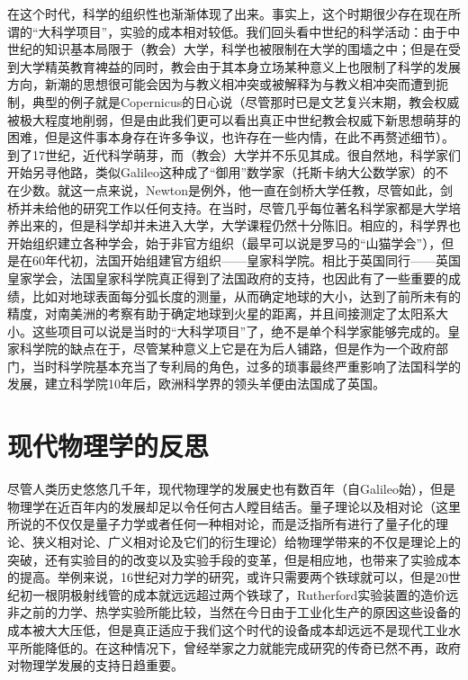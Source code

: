 \documentclass{article}
\begin{document}
在这个时代，科学的组织性也渐渐体现了出来\cite{1}。事实上，这个时期很少存在现在所谓的“大科学项目”，实验的成本相对较低。我们回头看中世纪的科学活动：由于中世纪的知识基本局限于（教会）大学，科学也被限制在大学的围墙之中；但是在受到大学精英教育裨益的同时，教会由于其本身立场某种意义上也限制了科学的发展方向，新潮的思想很可能会因为与教义相冲突或被解释为与教义相冲突而遭到扼制，典型的例子就是Copernicus的日心说（尽管那时已是文艺复兴末期，教会权威被极大程度地削弱，但是由此我们更可以看出真正中世纪教会权威下新思想萌芽的困难，但是这件事本身存在许多争议，也许存在一些内情，在此不再赘述细节）。到了17世纪，近代科学萌芽，而（教会）大学并不乐见其成。很自然地，科学家们开始另寻他路，类似Galileo这种成了“御用”数学家（托斯卡纳大公数学家）的不在少数。就这一点来说，Newton是例外，他一直在剑桥大学任教，尽管如此，剑桥并未给他的研究工作以任何支持。在当时，尽管几乎每位著名科学家都是大学培养出来的，但是科学却并未进入大学，大学课程仍然十分陈旧。相应的，科学界也开始组织建立各种学会，始于非官方组织（最早可以说是罗马的“山猫学会”），但是在60年代初，法国开始组建官方组织——皇家科学院。相比于英国同行——英国皇家学会，法国皇家科学院真正得到了法国政府的支持，也因此有了一些重要的成绩，比如对地球表面每分弧长度的测量，从而确定地球的大小，达到了前所未有的精度，对南美洲的考察有助于确定地球到火星的距离，并且间接测定了太阳系大小。这些项目可以说是当时的“大科学项目”了，绝不是单个科学家能够完成的。皇家科学院的缺点在于，尽管某种意义上它是在为后人铺路，但是作为一个政府部门，当时科学院基本充当了专利局的角色，过多的琐事最终严重影响了法国科学的发展，建立科学院10年后，欧洲科学界的领头羊便由法国成了英国。

\section{现代物理学的反思}

尽管人类历史悠悠几千年，现代物理学的发展史也有数百年（自Galileo始），但是物理学在近百年内的发展却足以令任何古人瞠目结舌。量子理论以及相对论（这里所说的不仅仅是量子力学或者任何一种相对论，而是泛指所有进行了量子化的理论、狭义相对论、广义相对论及它们的衍生理论）给物理学带来的不仅是理论上的突破，还有实验目的的改变以及实验手段的变革，但是相应地，也带来了实验成本的提高。举例来说，16世纪对力学的研究，或许只需要两个铁球就可以，但是20世纪初一根阴极射线管的成本就远远超过两个铁球了，Rutherford实验装置的造价远非之前的力学、热学实验所能比较，当然在今日由于工业化生产的原因这些设备的成本被大大压低，但是真正适应于我们这个时代的设备成本却远远不是现代工业水平所能降低的。在这种情况下，曾经举家之力就能完成研究的传奇已然不再，政府对物理学发展的支持日趋重要。
\end{document}

